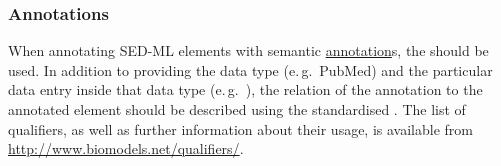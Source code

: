 \subsubsection{Annotations}
\label{sec:annotations}
When annotating SED-ML elements with semantic \hyperref[class:annotation]{annotation}s, the  should be used. In addition to providing the data type (e.\,g.\ PubMed) and the particular data entry inside that data type (e.\,g.\ ), the relation of the annotation to the annotated element should be described using the standardised . The list of qualifiers, as well as further information about their usage, is available from \url{http://www.biomodels.net/qualifiers/}.


